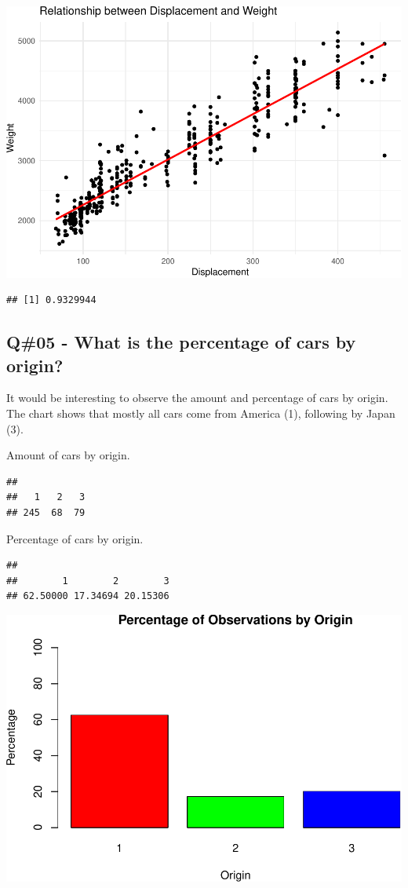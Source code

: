 \documentclass[
]{article}
\begin{document}
\includegraphics{QuestionCar_files/figure-latex/unnamed-chunk-4-1.pdf}

\begin{verbatim}
## [1] 0.9329944
\end{verbatim}

\newpage

\hypertarget{q05---what-is-the-percentage-of-cars-by-origin}{%
\subsection{Q\#05 - What is the percentage of cars by
origin?}\label{q05---what-is-the-percentage-of-cars-by-origin}}

It would be interesting to observe the amount and percentage of cars by
origin. The chart shows that mostly all cars come from America (1),
following by Japan (3).

Amount of cars by origin.

\begin{verbatim}
## 
##   1   2   3 
## 245  68  79
\end{verbatim}

Percentage of cars by origin.

\begin{verbatim}
## 
##        1        2        3 
## 62.50000 17.34694 20.15306
\end{verbatim}

\includegraphics{QuestionCar_files/figure-latex/unnamed-chunk-6-1.pdf}
\end{document}
